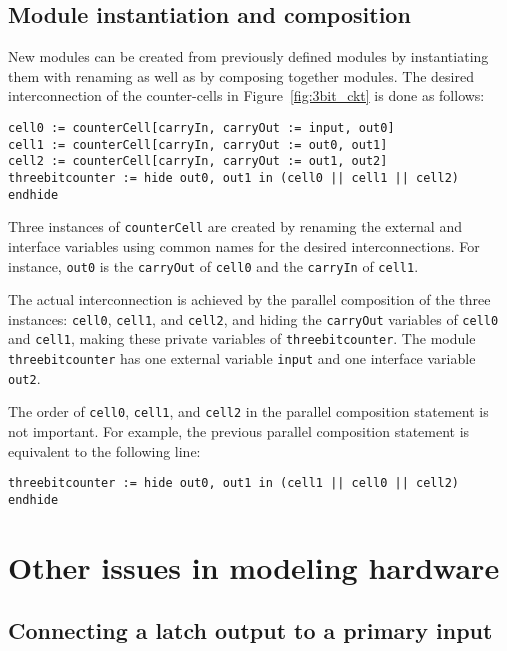 \subsection{Module instantiation and composition}
New modules can be created from previously defined modules by
instantiating them with renaming as well as by composing together modules. The
desired interconnection of the counter-cells in Figure~\ref{fig:3bit_ckt} is done as follows: 


\begin{verbatim}
cell0 := counterCell[carryIn, carryOut := input, out0]
cell1 := counterCell[carryIn, carryOut := out0, out1]
cell2 := counterCell[carryIn, carryOut := out1, out2]
threebitcounter := hide out0, out1 in (cell0 || cell1 || cell2) endhide
\end{verbatim}

Three instances of {\tt counterCell} are created by renaming the
external and interface variables using common names for the desired
interconnections. For instance, {\tt out0} is the {\tt carryOut} of
{\tt cell0} and the {\tt carryIn} of {\tt cell1}. 

The actual interconnection is achieved by the parallel composition of
the three instances: {\tt cell0}, {\tt cell1}, and {\tt cell2}, and
hiding the {\tt carryOut} variables of {\tt cell0} and {\tt cell1},
making these private variables of {\tt threebitcounter}. The module \\
{\tt threebitcounter} has one external variable {\tt input} and one
interface variable {\tt out2}. 

The order of {\tt cell0}, {\tt cell1}, and {\tt cell2}
in the parallel composition statement is not important.
For example, the previous parallel composition statement is equivalent to the following line:

\begin{verbatim}
threebitcounter := hide out0, out1 in (cell1 || cell0 || cell2) endhide
\end{verbatim}

\section{Other issues in modeling hardware}

\subsection{Connecting a latch output to a primary input}

